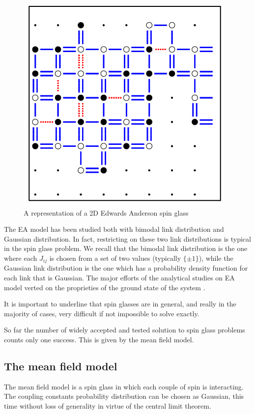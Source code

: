 \begin{figure}[h]
\centering
\includegraphics[scale =0.6]{img/edwards.jpg}
\caption{A representation of a 2D Edwards Anderson spin glass}
\label{fig:EA}
\end{figure}

 The EA model has been studied both with bimodal link distribution and Gaussian distribution. In fact, restricting on these two link distributions is typical in the spin glass problem. We recall that the bimodal link distribution is the one where each $J_{ij}$ is chosen from a set of two values (typically $\{\pm 1\}$), while the Gaussian link distribution is the one which has a probability density function for each link that is Gaussian. The major efforts of the analytical studies on EA model verted on the proprieties of the ground state of the system \cite{ground}.

It is important to underline that spin glasses are in general, and really in the majority of cases, very difficult if not impossible to solve exactly.

So far the number of widely accepted and tested solution to spin glass problems counts only one success. This is given by the mean field model.

\subsection{The mean field model}

The mean field model is a spin glass in which each couple of spin is interacting. The coupling constants probability distribution can be chosen as Gaussian, this time without loss of generality in virtue of the central limit theorem.

